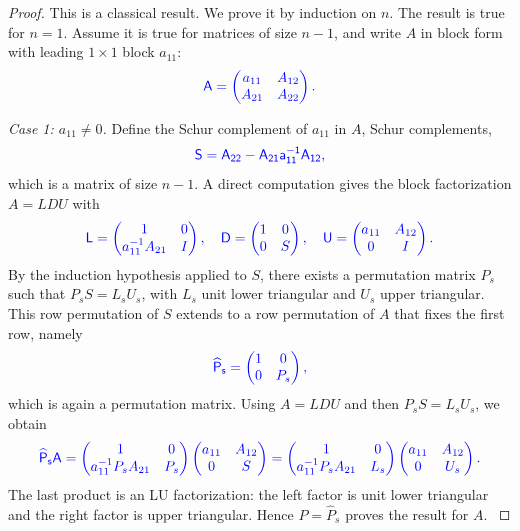 \documentclass[10pt,twoside]{siamart1116}
\numberwithin{theorem}{section}
\providecommand{\DIFadd}[1]{{\protect\color{blue} \sf #1}} %
\providecommand{\DIFdel}[1]{{\protect\color{red} \scriptsize #1}} %
\providecommand{\DIFaddbegin}{} %
\providecommand{\DIFaddend}{} %
\providecommand{\DIFdelbegin}{} %
\providecommand{\DIFdelend}{} %
\begin{document}
\begin{proof}
  \DIFadd{This is a classical result. We prove it by induction on $n$. The result is true for $n=1$. Assume it is true for matrices of size $n-1$, and write $A$ in block form with leading $1 \times 1$ block $a_{11}$:
  }\[
    \DIFadd{A =
    \begin{pmatrix}
      a_{11} & A_{12} \\
      A_{21} & A_{22}
    \end{pmatrix}.
  }\]

  \DIFadd{\emph{Case 1: $a_{11} \neq 0$.} Define the Schur complement of $a_{11}$ in $A$}\DIFaddend ,
  \DIFdelbegin \DIFdel{Schur complements, }\DIFdelend \DIFaddbegin \[
    \DIFadd{S = A_{22} - A_{21} a_{11}^{-1} A_{12},
  }\]
  \DIFadd{which is a matrix of size $n-1$. A direct computation gives the block factorization $A = LDU$ with
  }\[
    \DIFadd{L =
    \begin{pmatrix}
      1                  & 0 \\
      a_{11}^{-1} A_{21} & I
    \end{pmatrix}, \quad
    D =
    \begin{pmatrix}
      1 & 0 \\
      0 & S
    \end{pmatrix}, \quad
    U =
    \begin{pmatrix}
      a_{11} & A_{12} \\
      0      & I
    \end{pmatrix}.
  }\]
  \DIFadd{By the induction hypothesis applied to $S$, there exists a permutation matrix $P_s$ such that $P_s S = L_s U_s$, with $L_s$ unit lower triangular and $U_s$ upper triangular. This row permutation of $S$ extends to a row permutation of $A$ that fixes the first row, namely
  }\[
    \DIFadd{\widehat{P}_s =
    \begin{pmatrix}
      1 & 0   \\
      0 & P_s
    \end{pmatrix},
  }\]
  \DIFadd{which is again a permutation matrix. Using $A = LDU$ and then $P_s S = L_s U_s$, we obtain
  }\[
    \DIFadd{\widehat{P}_s A
    =
    \begin{pmatrix}
      1                    & 0   \\
      a_{11}^{-1} P_s A_{21} & P_s
    \end{pmatrix}
    \begin{pmatrix}
      a_{11} & A_{12} \\
      0      & S
    \end{pmatrix}
    =
    \begin{pmatrix}
      1                    & 0   \\
      a_{11}^{-1} P_s A_{21} & L_s
    \end{pmatrix}
    \begin{pmatrix}
      a_{11} & A_{12} \\
      0      & U_s
    \end{pmatrix}.
  }\]
  \DIFadd{The last product is an LU factorization: the left factor is unit lower triangular and the right factor is upper triangular. Hence $P = \widehat{P}_s$ proves the result for $A$.
}


\end{proof}
\end{document}
